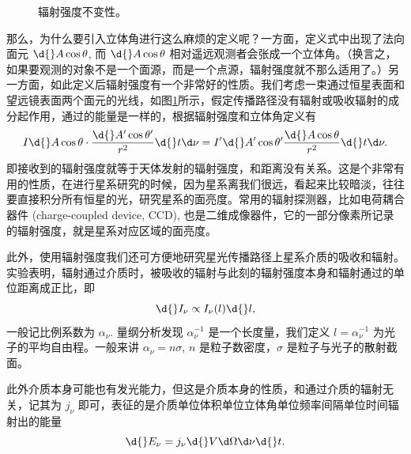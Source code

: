 \documentclass[../天体物理基础.tex]{subfiles}
\begin{document}
\begin{figure}[!htp]
\captionsetup{justification=raggedright, singlelinecheck=false}
\caption{辐射强度不变性。}
\label{辐射强度不变性。}
\end{figure}

那么，为什么要引入立体角进行这么麻烦的定义呢？一方面，定义式中出现了法向面元 $\d{}A\cos{\theta}$, 而 $\d{}A\cos{\theta}$ 相对遥远观测者会张成一个立体角。（换言之，如果要观测的对象不是一个面源，而是一个点源，辐射强度就不那么适用了。）另一方面，如此定义后辐射强度有一个非常好的性质。我们考虑一束通过恒星表面和望远镜表面两个面元的光线，如图\ref{辐射强度不变性。}所示，假定传播路径没有辐射或吸收辐射的成分起作用，通过的能量是一样的，根据辐射强度和立体角定义有
\begin{equation}
I\d{}A\cos{\theta}\cdot\frac{\d{}A'\cos{\theta'}}{r^{2}}\d{}t\d\nu=I'\d{}A'\cos{\theta'}\frac{\d{}A\cos{\theta}}{r^{2}}\d{}t\d\nu.
\end{equation}
即接收到的辐射强度就等于天体发射的辐射强度，和距离没有关系。这是个非常有用的性质，在进行星系研究的时候，因为星系离我们很远，看起来比较暗淡，往往要直接积分所有恒星的光，研究星系的面亮度。常用的辐射探测器，比如电荷耦合器件 (charge-coupled device, CCD), 也是二维成像器件，它的一部分像素所记录的辐射强度，就是星系对应区域的面亮度。

此外，使用辐射强度我们还可方便地研究星光传播路径上星系介质的吸收和辐射。实验表明，辐射通过介质时，被吸收的辐射与此刻的辐射强度本身和辐射通过的单位距离成正比，即
\begin{equation}
\d{}I_{\nu}\propto{}I_{\nu}\mleft(l\mright)\d{}l,
\end{equation}
一般记比例系数为 $\alpha_{\nu}$. 量纲分析发现 $\alpha_{\nu}^{-1}$ 是一个长度量，我们定义 $l=\alpha_{\nu}^{-1}$ 为光子的平均自由程。一般来讲 $\alpha_{\nu}=n\sigma$, $n$ 是粒子数密度，$\sigma$ 是粒子与光子的散射截面。

此外介质本身可能也有发光能力，但这是介质本身的性质，和通过介质的辐射无关，记其为 $j_{\nu}$ 即可，表征的是介质单位体积单位立体角单位频率间隔单位时间辐射出的能量
\begin{equation}
\d{}E_{\nu}=j_{\nu}\d{}V\d\Omega\d\nu\d{}t.
\end{equation}
\end{document}
